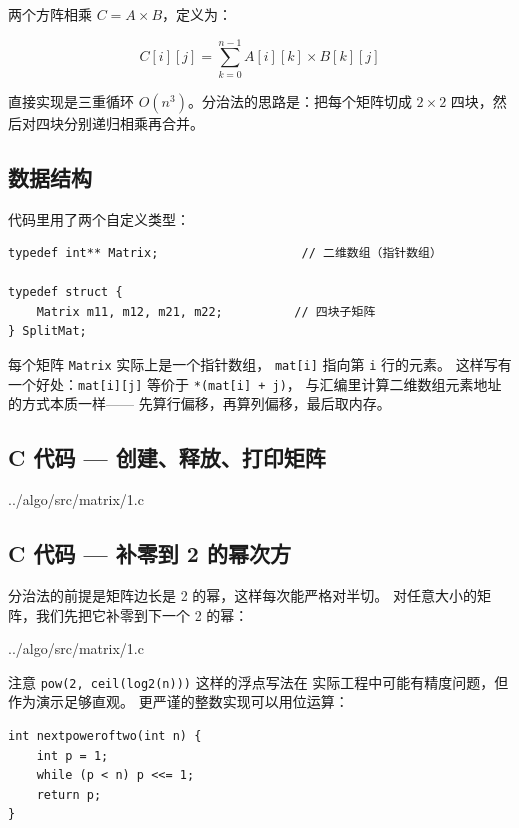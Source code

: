 两个方阵相乘 \(C = A \times B\)，定义为：

\[
C[i][j] = \sum_{k=0}^{n-1} A[i][k] \times B[k][j]
\]

直接实现是三重循环 \(O(n^3)\)。分治法的思路是：把每个矩阵切成
\(2 \times 2\) 四块，然后对四块分别递归相乘再合并。

\subsection{数据结构}

代码里用了两个自定义类型：

\begin{lstlisting}[style=cstyle]
typedef int** Matrix;                    // 二维数组（指针数组）

typedef struct {
    Matrix m11, m12, m21, m22;          // 四块子矩阵
} SplitMat;
\end{lstlisting}

每个矩阵 \texttt{Matrix} 实际上是一个指针数组，
\texttt{mat[i]} 指向第 \texttt{i} 行的元素。
这样写有一个好处：\texttt{mat[i][j]} 等价于 \texttt{*(mat[i] + j)}，
与汇编里计算二维数组元素地址的方式本质一样——
先算行偏移，再算列偏移，最后取内存。

\subsection{C 代码 — 创建、释放、打印矩阵}


{../algo/src/matrix/1.c}

\subsection{C 代码 — 补零到 2 的幂次方}

分治法的前提是矩阵边长是 2 的幂，这样每次能严格对半切。
对任意大小的矩阵，我们先把它补零到下一个 2 的幂：


{../algo/src/matrix/1.c}

注意 \texttt{pow(2, ceil(log2(n)))} 这样的浮点写法在
实际工程中可能有精度问题，但作为演示足够直观。
更严谨的整数实现可以用位运算：

\begin{lstlisting}[style=cstyle]
int nextpoweroftwo(int n) {
    int p = 1;
    while (p < n) p <<= 1;
    return p;
}
\end{lstlisting}

